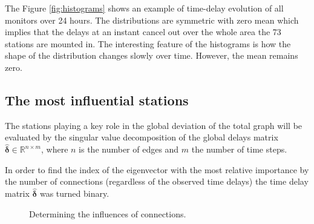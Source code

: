 \documentclass[12pt, sumlimits, intlimits]{article}
\begin{document}
The Figure \ref{fig:histograms} shows an example of time-delay evolution of all monitors over 24 hours. The distributions are symmetric with zero mean which implies that the delays at an instant cancel out over the whole area the 73 stations are mounted in. The interesting feature of the histograms is how the shape of the distribution changes slowly over time. However, the mean remains zero.


\subsection{The most influential stations}

The stations playing a key role in the global deviation of the total graph will be evaluated by the singular value decomposition of the global delays matrix $\bm{\hat{\delta}} \in\mathbb{R}^{n\times m}$, where $n$ is the number of edges and $m$ the number of time steps.

In order to find the index of the eigenvector with the most relative importance by the number of connections (regardless of the observed time delays) the time delay matrix $\bm{\hat{\delta}}$ was turned binary.

\begin{figure}[ht] 
	\centering 
	\caption{Determining the influences of connections.}
	\label{fig:connectioninfluence}
\end{figure}
\end{document}
